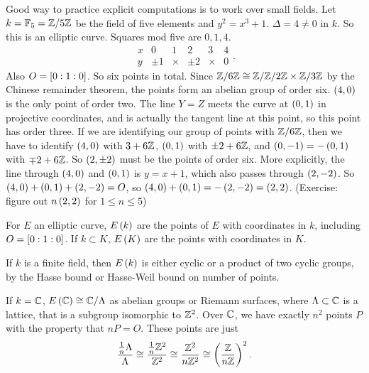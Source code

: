 \begin{example*}
Good way to practice explicit computations is to work over small fields. Let $ k = \F_5 = \Z / 5\Z $ be the field of five elements and $ y^2 = x^3 + 1 $. $ \Delta = 4 \ne 0 $ in $ k $. So this is an elliptic curve. Squares mod five are $ 0, 1, 4 $.
$$
\begin{array}{c|ccccc}
x & 0 & 1 & 2 & 3 & 4 \\
\hline
y & \pm 1 & \times & \pm 2 & \times & 0
\end{array}.
$$
Also $ O = \sb{0 : 1 : 0} $. So six points in total. Since $ \Z / 6\Z \cong \Z / \Z / 2\Z \times \Z / 3\Z $ by the Chinese remainder theorem, the points form an abelian group of order six. $ \rb{4, 0} $ is the only point of order two. The line $ Y = Z $ meets the curve at $ \rb{0, 1} $ in projective coordinates, and is actually the tangent line at this point, so this point has order three. If we are identifying our group of points with $ \Z / 6\Z $, then we have to identify $ \rb{4, 0} $ with $ 3 + 6\Z $, $ \rb{0, 1} $ with $ \pm 2 + 6\Z $, and $ \rb{0, -1} = -\rb{0, 1} $ with $ \mp 2 + 6\Z $. So $ \rb{2, \pm 2} $ must be the points of order six. More explicitly, the line through $ \rb{4, 0} $ and $ \rb{0, 1} $ is $ y = x + 1 $, which also passes through $ \rb{2, -2} $. So $ \rb{4, 0} + \rb{0, 1} + \rb{2, -2} = O $, so $ \rb{4, 0} + \rb{0, 1} = -\rb{2, -2} = \rb{2, 2} $. (Exercise: figure out $ n\rb{2, 2} $ for $ 1 \le n \le 5 $)
\end{example*}

For $ E $ an elliptic curve, $ E\rb{k} $ are the points of $ E $ with coordinates in $ k $, including $ O = \sb{0 : 1 : 0} $. If $ k \subset K $, $ E\rb{K} $ are the points with coordinates in $ K $.

\begin{example*}
If $ k $ is a finite field, then $ E\rb{k} $ is either cyclic or a product of two cyclic groups, by the Hasse bound or Hasse-Weil bound on number of points.
\end{example*}

\begin{example*}
If $ k = \C $, $ E\rb{\C} \cong \C / \Lambda $ as abelian groups or Riemann surfaces, where $ \Lambda \subset \C $ is a lattice, that is a subgroup isomorphic to $ \Z^2 $. Over $ \C $, we have exactly $ n^2 $ points $ P $ with the property that $ nP = O $. These points are just
$$ \dfrac{\tfrac{1}{n}\Lambda}{\Lambda} \cong \dfrac{\tfrac{1}{n}\Z^2}{\Z^2} \cong \dfrac{\Z^2}{n\Z^2} \cong \rb{\dfrac{\Z}{n\Z}}^2. $$
\end{example*}

